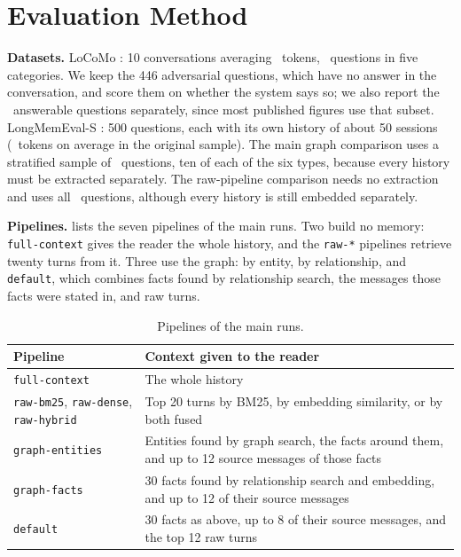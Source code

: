 \documentclass[11pt,letterpaper]{article}
\newcommand{\pipe}[1]{\texttt{#1}}
\begin{document}
\section{Evaluation Method}
\label{sec:method}

\textbf{Datasets.} LoCoMo \citep{maharana2024evaluating}: 10 conversations averaging \numLocomoHistoryTokens\ tokens, \numLocomoQuestions\ questions in five categories. We keep the 446 adversarial questions, which have no answer in the conversation, and score them on whether the system says so; we also report the \numLocomoAnswerable\ answerable questions separately, since most published figures use that subset. LongMemEval-S \citep{wu2024longmemeval}: 500 questions, each with its own history of about 50 sessions (\numLmeHistoryTokens\ tokens on average in the original sample). The main graph comparison uses a stratified sample of \numLmeQuestions\ questions, ten of each of the six types, because every history must be extracted separately. The raw-pipeline comparison needs no extraction and uses all \numFullLmeQuestions\ questions, although every history is still embedded separately.

\textbf{Pipelines.}  lists the seven pipelines of the main runs. Two build no memory: \pipe{full-context} gives the reader the whole history, and the \pipe{raw-*} pipelines retrieve twenty turns from it. Three use the graph: by entity, by relationship, and \pipe{default}, which combines facts found by relationship search, the messages those facts were stated in, and raw turns.

\begin{table}[ht]
\centering
\caption{Pipelines of the main runs.}
\label{tab:pipelines}
\small
\begin{tabularx}{\textwidth}{@{}lX@{}}
\toprule
Pipeline & Context given to the reader \\
\midrule
\pipe{full-context} & The whole history \\
\pipe{raw-bm25}, \pipe{raw-dense}, \pipe{raw-hybrid} & Top 20 turns by BM25, by embedding similarity, or by both fused \\
\pipe{graph-entities} & Entities found by graph search, the facts around them, and up to 12 source messages of those facts \\
\pipe{graph-facts} & 30 facts found by relationship search and embedding, and up to 12 of their source messages \\
\pipe{default} & 30 facts as above, up to 8 of their source messages, and the top 12 raw turns \\
\bottomrule
\end{tabularx}
\end{table}
\end{document}
